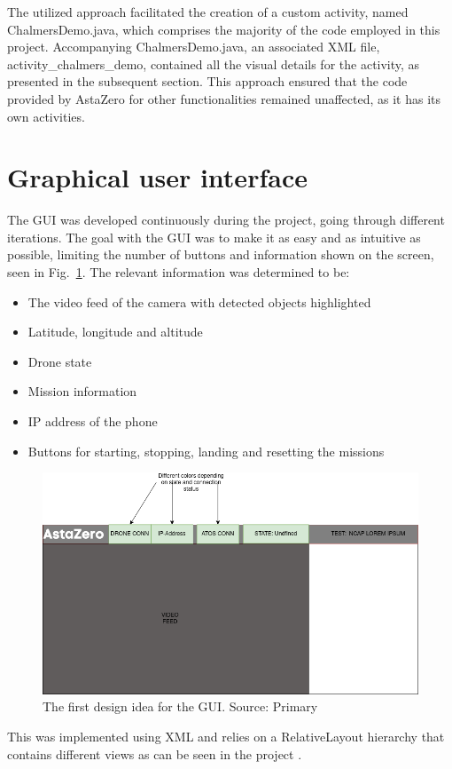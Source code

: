 The utilized approach facilitated the creation of a custom activity, named ChalmersDemo.java, which comprises the majority of the code employed in this project. Accompanying ChalmersDemo.java, an associated XML file, activity\_chalmers\_demo, contained all the visual details for the activity, as presented in the subsequent section. This approach ensured that the code provided by AstaZero for other functionalities remained unaffected, as it has its own activities.

\section{Graphical user interface} \label{sec:implement_GUI}
The GUI was developed continuously during the project, going through different iterations. The goal with the GUI was to make it as easy and as intuitive as possible, limiting the number of buttons and information shown on the screen, seen in Fig.~\ref{fig:GUI_v1}. The relevant information was determined to be:\\

\begin{itemize}
    \item The video feed of the camera with detected objects highlighted
    \item Latitude, longitude and altitude
    \item Drone state
    \item Mission information
    \item IP address of the phone
    \item Buttons for starting, stopping, landing and resetting the missions
\end{itemize}
\begin{figure}[!h]
    \centering
    \includegraphics[width=\textwidth]{figure/v_1.2_GUI_demo_app.png}
    \caption{The first design idea for the GUI. Source: Primary}
    \label{fig:GUI_v1}
\end{figure}
This was implemented using XML and relies on a RelativeLayout hierarchy that contains different views as can be seen in the project \cite{azGithubMobil}. 
\newline

